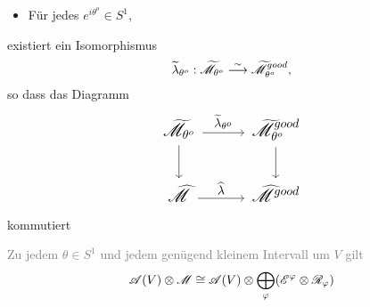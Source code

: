 \begin{paracol}{2} %
  \begin{thm}
    \begin{itemize}
      \item Für jedes $e^{i\theta^o}\in S^1$,
    \end{itemize}
    existiert ein Isomorphismus
    \[
      \widetilde\lambda_{\theta^o}: \widetilde{\mathscr{M}}_{\theta^o}
      \overset{\sim}{\longrightarrow}\widetilde{\mathscr{M}}^{good}_{\theta^o},
    \]
    so dass das Diagramm
    \[ \Large\begin{tikzcd}
        \tilde\sM_{\theta^o} \dar \rar{\tilde\lambda_{\theta^o}} &
        \tilde\sM^{good}_{\theta^o} \dar
        \\\hat\sM \rar{\hat\lambda} &
        \hat\sM^{good}
    \end{tikzcd} \]
    kommutiert
  \end{thm}
\switchcolumn %
\begin{thm}
  \textcolor{gray}{%
    Zu jedem $\theta\in S^1$ und jedem genügend kleinem Intervall um $V$ gilt
    \[
      \mathscr{A}(V)\otimes\mathscr{M}\cong\mathscr{A}(V)\otimes\bigoplus_\varphi(\mathscr{E}^\varphi\otimes\mathscr{R}_\varphi)
    \]
  }
\end{thm}
\end{paracol} %
